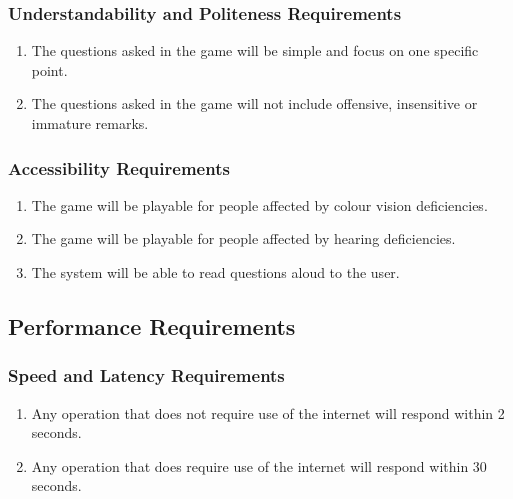 \documentclass[titlepage]{article}
\newcounter{req}
\begin{document}
		\subsubsection{Understandability and Politeness Requirements}
		\label{ssub:understandability_and_politeness_requirements}
		\begin{enumerate}[{UH}1. ]
		\setcounter{enumi}{\value{req}}
			\item 
			The questions asked in the game will be simple and focus on one specific point. %
			\item
			The questions asked in the game will not include offensive, insensitive or immature remarks.
		\setcounter{req}{\theenumi}
		\end{enumerate}
		
		\subsubsection{Accessibility Requirements}
		\label{ssub:accessibility_requirements}
		\begin{enumerate}[{UH}1. ]
		\setcounter{enumi}{\value{req}}
			\item 
			The game will be playable for people affected by colour vision deficiencies.
			\item
			The game will be playable for people affected by hearing deficiencies.
			\item
			The system will be able to read questions aloud to the user.
		\setcounter{req}{\theenumi}
		\end{enumerate}
		
		
		\subsection{Performance Requirements}
		\setcounter{req}{0}
		\label{sub:performance_requirements}
		
		
		\subsubsection{Speed and Latency Requirements}
		\label{ssub:speed_and_latency_requirements}
		\begin{enumerate}[{PR}1.]
		\setcounter{enumi}{\value{req}}
			\item
			Any operation that does not require use of the internet will respond within 2 seconds.
			\item
			Any operation that does require use of the internet will respond within 30 seconds.
		\setcounter{req}{\theenumi}
		\end{enumerate}
		
\end{document}
